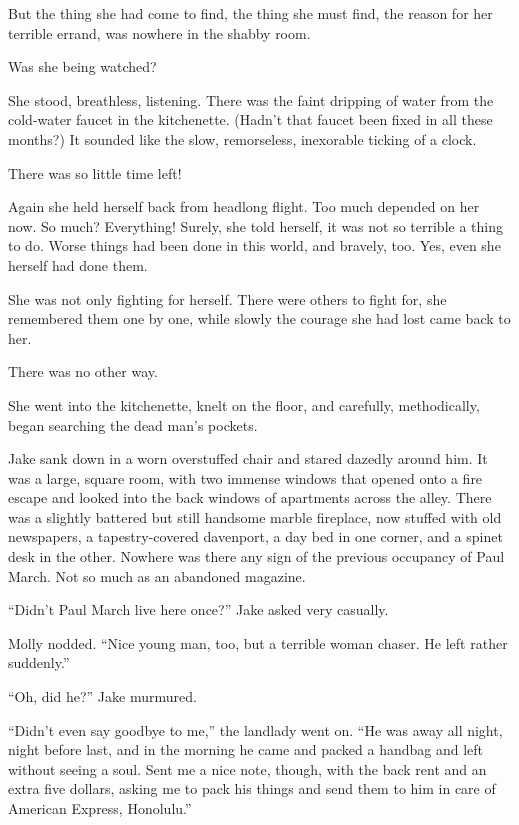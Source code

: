 \documentclass{novel}
\begin{document}
But the thing she had come to find, the thing she must find, the reason for her terrible errand, was nowhere in the shabby room.

Was she being watched?

She stood, breathless, listening. There was the faint dripping of water from the cold-water faucet in the kitchenette. (Hadn’t that faucet been fixed in all these months?) It sounded like the slow, remorseless, inexorable ticking of a clock.

There was so little time left!

Again she held herself back from headlong flight. Too much depended on her now. So much? Everything! Surely, she told herself, it was not so terrible a thing to do. Worse things had been done in this world, and bravely, too. Yes, even she herself had done them.

She was not only fighting for herself. There were others to fight for, she remembered them one by one, while slowly the courage she had lost came back to her.

There was no other way.

She went into the kitchenette, knelt on the floor, and carefully, methodically, began searching the dead man’s pockets.

\begin{ChapterStart}
\vspace{3\nbs}
\end{ChapterStart}

Jake sank down in a worn overstuffed chair and stared dazedly around him. It was a large, square room, with two immense windows that opened onto a fire escape and looked into the back windows of apartments across the alley. There was a slightly battered but still handsome marble fireplace, now stuffed with old newspapers, a tapestry-covered davenport, a day bed in one corner, and a spinet desk in the other. Nowhere was there any sign of the previous occupancy of Paul March. Not so much as an abandoned magazine.

“Didn’t Paul March live here once?” Jake asked very casually.

Molly nodded. “Nice young man, too, but a terrible woman chaser. He left rather suddenly.”

“Oh, did he?” Jake murmured.

“Didn’t even say goodbye to me,” the landlady went on. “He was away all night, night before last, and in the morning he came and packed a handbag and left without seeing a soul. Sent me a nice note, though, with the back rent and an extra five dollars, asking me to pack his things and send them to him in care of American Express, Honolulu.”
\end{document}
